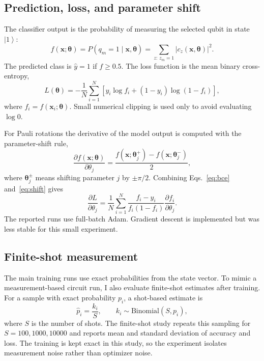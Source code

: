\documentclass[10pt,a4paper]{article}
\newcommand{\ket}[1]{\left|#1\right\rangle}
\newcommand{\btheta}{\bm{\theta}}
\newcommand{\bx}{\bm{x}}
\begin{document}
\subsection{Prediction, loss, and parameter shift}
The classifier output is the probability of measuring the selected qubit in state \(\ket{1}\):
\begin{equation}
  f(\bx;\btheta)=P(q_m=1\mid\bx,\btheta)
  =\sum_{z:\,z_m=1}|c_z(\bx,\btheta)|^2 .
\end{equation}
The predicted class is \(\hat y=1\) if \(f\ge 0.5\). The loss function is the mean binary cross-entropy,
\begin{equation}\label{eq:bce}
  L(\btheta)=-\frac{1}{N}\sum_{i=1}^{N}\left[y_i\log f_i+(1-y_i)\log(1-f_i)\right],
\end{equation}
where \(f_i=f(\bx_i;\btheta)\). Small numerical clipping is used only to avoid evaluating \(\log 0\).

For Pauli rotations the derivative of the model output is computed with the parameter-shift rule,
\begin{equation}\label{eq:shift}
\frac{\partial f(\bx;\btheta)}{\partial \theta_j}
=\frac{f(\bx;\btheta_j^+)-f(\bx;\btheta_j^-)}{2},
\end{equation}
where \(\btheta_j^\pm\) means shifting parameter \(j\) by \(\pm\pi/2\). Combining Eqs.~\eqref{eq:bce} and~\eqref{eq:shift} gives
\begin{equation}\label{eq:lossgrad}
\frac{\partial L}{\partial \theta_j}
=\frac{1}{N}\sum_{i=1}^{N}
\frac{f_i-y_i}{f_i(1-f_i)}
\frac{\partial f_i}{\partial \theta_j}.
\end{equation}
The reported runs use full-batch Adam. Gradient descent is implemented but was less stable for this small experiment.

\subsection{Finite-shot measurement}
The main training runs use exact probabilities from the state vector. To mimic a measurement-based circuit run, I also evaluate finite-shot estimates after training. For a sample with exact probability \(p_i\), a shot-based estimate is
\begin{equation}
  \hat p_i=\frac{k_i}{S}, \qquad k_i\sim\mathrm{Binomial}(S,p_i),
\end{equation}
where \(S\) is the number of shots. The finite-shot study repeats this sampling for \(S=100,1000,10000\) and reports mean and standard deviation of accuracy and loss. The training is kept exact in this study, so the experiment isolates measurement noise rather than optimizer noise.
\end{document}
